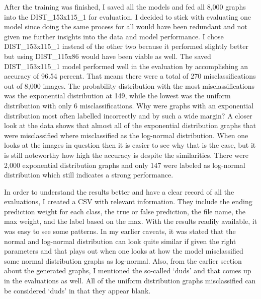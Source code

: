 \documentclass[12pt]{article}
\begin{document}
            After the training was finished, I saved all the models and fed all 8,000 graphs into the DIST\_153x115\_1 for evaluation. 
            I decided to stick with evaluating one model since doing the same process for all would have been redundant 
            and not given me further insights into the data and model performance. 
            I chose DIST\_153x115\_1 instead of the other two because it performed slightly better 
            but using DIST\_115x86 would have been viable as well. The saved DIST\_153x115\_1 model performed well in the evaluation 
            by accomplishing an accuracy of 96.54 percent. That means there were a total of 270 misclassifications out of 8,000 images. 
            The probability distribution with the most misclassifications was the exponential distribution at 149, 
            while the lowest was the uniform distribution with only 6 misclassifications. 
            Why were graphs with an exponential distribution most often labelled incorrectly 
            and by such a wide margin? A closer look at the data shows that almost all of the exponential distribution graphs 
            that were misclassified where misclassified as the log-normal distribution. 
            When one looks at the images in question then it is easier to see why that is the case, 
            but it is still noteworthy how high the accuracy is despite the similarities. 
            There were 2,000 exponential distribution graphs and only 147 were labeled as log-normal distribution 
            which still indicates a strong performance.
            
            In order to understand the results better and have a clear record of all the evaluations, 
            I created a CSV with relevant information. They include the ending prediction weight for each class, 
            the true or false prediction, the file name, the max weight, and the label based on the max.
            With the results readily available, it was easy to see some patterns. 
            In my earlier caveats, it was stated that the normal and log-normal distribution can look quite similar 
            if given the right parameters and that plays out when one looks at 
            how the model misclassified some normal distribution graphs as log-normal. 
            Also, from the earlier section about the generated graphs, 
            I mentioned the so-called ‘duds’ and that comes up in the evaluations as well. 
            All of the uniform distribution graphs misclassified can be considered ‘duds’ in that they appear blank.
            
\end{document}
